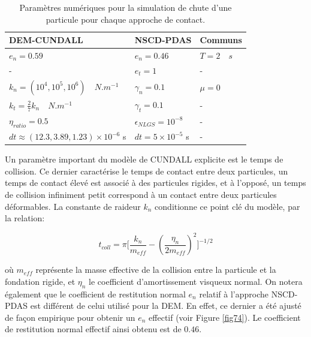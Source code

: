 \begin{center}
\begin{table}[!h]
\begin{tabular}{ |p{5.5cm}|p{3.8cm}|p{3.4cm}| }
 \hline \rowcolor{lightgray}
 DEM-CUNDALL& NSCD-PDAS& Communs\\
 \hline
 $e_n = 0.59$ & $e_n = 0.46$ & $T = 2 \quad s$\\
 -& $e_t = 1$ & -\\
 $k_n = (10^4, 10^5, 10^6) \quad N.m^{-1}$ & $\gamma_n = 0.1$ & $\mu = 0$\\
 $k_t = \frac{2}{7} k_n \quad N.m^{-1}$ & $\gamma_t = 0.1$ & -\\
 $\eta_{ratio} = 0.5$& $\epsilon_{NLGS} =  10^{-8}$ & -\\
 $dt \approx (12.3, 3.89, 1.23) \times 10^{-6}$ s & $dt = 5\times10^{-5}$ \quad s& -\\
 \hline
\end{tabular}
\caption{Paramètres numériques pour la simulation de chute d'une particule pour chaque approche de contact.}\label{tab_42}
\end{table}
\end{center}
\vspace{-1cm}
Un paramètre important du modèle de CUNDALL explicite est le temps de collision. Ce dernier caractérise le temps de contact entre deux particules, un temps de contact élevé est associé à des particules rigides, et à l'opposé, un temps de collision infiniment petit correspond à un contact entre deux particules déformables. La constante de raideur $k_n$ conditionne ce point clé du modèle, par la relation:

\vspace{-0.5cm}
\begin{equation}
    t_{coll} = \pi \Bigg[\frac{k_n}{m_{eff}} - (\frac{\eta_n}{2m_{eff}})^2\Bigg]^{-1/2}\label{t_coll}
\end{equation}

\noindent où $m_{eff}$ représente la masse effective de la collision entre la particule et la fondation rigide, et $\eta_n$ le coefficient d'amortissement visqueux normal. On notera également que le coefficient de restitution normal $e_n$ relatif à l'approche NSCD-PDAS est différent de celui utilisé pour la DEM. En effet, ce dernier a été ajusté de façon empirique pour obtenir un $e_n$ effectif (voir Figure \ref{fig74}). Le coefficient de restitution normal effectif ainsi obtenu est de $0.46$.

